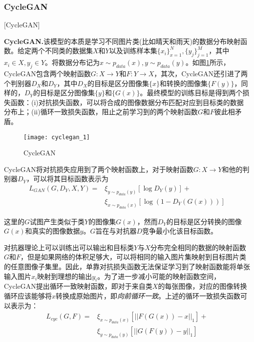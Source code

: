 
\subsubsection{CycleGAN}[CycleGAN]

\textbf{CycleGAN.}\cite{CycleGAN}\quad 该模型的本质是学习不同图片类(比如晴天和雨天)的数据分布映射函数。给定两个不同类的数据集$X$和$Y$以及训练样本集$\{x_i\}_{x=1}^N, \{y_j\}_{j=1}^M$，其中$x_i\in X, y_j\in Y$。将数据分布记为$x\sim p_{data}(x), y\sim p_{data}(y)$。如图\ref{lable-cyclgan}所示，CycleGAN包含两个映射函数$G: X\to Y$和$F: Y\to X$，其次，CycleGAN还引进了两个判别器$D_X$和$D_Y$，其中$D_X$的目标是区分图像集$\{x\}$和转换的图像集$\{F(y)\}$，同样的，$D_Y$的目标是区分图像集$\{y\}$和$\{G(x)\}$。最终模型的训练目标是得到两个损失函数：(i)对抗损失函数，可以将合成的图像数据分布匹配对应到目标类的数据分布上；(ii)循环一致损失函数，阻止之前学习到的两个映射函数$G$和$F$彼此相矛盾。

\begin{figure}[h]
    \centering
    \texttt{[image: cyclegan\_1]}
    \caption{CycleGAN}
    \label{lable-cyclgan} 
\end{figure}

CycleGAN将对抗损失应用到了两个映射函数上，对于映射函数$G:X\to Y$和他的判别器$D_Y$，可以将其目标函数表示为
\begin{equation}
\begin{aligned}
    \label{eq:2}
    L_{GAN}(G,D_Y,X,Y)= & \xi_{y\sim p_{data}(y)}[\log D_Y(y)] + \\
    & \xi_{x\sim p_{data}(x)}[\log (1-D_Y(G(x)))]
\end{aligned}
\end{equation}

这里的$G$试图产生类似于类$Y$的图像集$G(x)$，然而$D_Y$的目标是区分转换的图像$G(x)$和真实的图像数据$y$。$G$旨在与对抗器$D$竞争最小化该目标函数。

对抗器理论上可以训练出可以输出和目标类$Y$与$X$分布完全相同的数据的映射函数$G$和$F$，但是如果网络的体积足够大，可以将相同的输入图片集映射到目标图片类的任意图像子集里。因此，单靠对抗损失函数无法保证学习到了映射函数能将单张输入图片$x_i$映射到理想的输出$y_i$。为了进一步减小可能的映射函数空间，CycleGAN提出循环一致映射函数，即对于来自类$X$的每张图像，对应的图像转换循环应该能够将$x$转换成原始图片，即\textit{向前循环一致}。上述的循环一致损失函数可以表示为：
\begin{equation}
\begin{aligned}
    \label{eq:3}
    L_{cyc}(G,F)= & \xi_{x\sim p_{data}(x)}[||F(G(x))-x||_1] + \\
    & \xi_{y\sim p_{data}(y)}[||G(F(y))-y||_1]
\end{aligned}
\end{equation}

